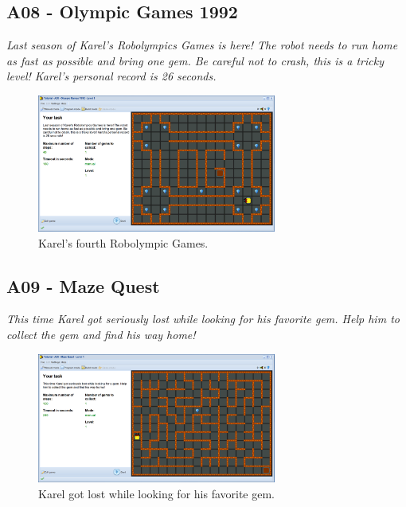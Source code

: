\documentclass[article,A4,12pt]{llncs}
\begin{document}
\subsection{A08 - Olympic Games 1992}

{\em Last season of Karel's Robolympics Games is here! The 
robot needs to run home as fast as possible and bring one gem. 
Be careful not to crash, this is a tricky level! Karel's personal record is 26 seconds.}\\[-7mm]

\begin{figure}[!ht]
\begin{center}
\includegraphics[width=0.7\textwidth]{img/a08.png}
\end{center}
\vspace{-4mm}
\caption{Karel's fourth Robolympic Games.}
\label{fig:a08}
\vspace{-4mm}
\end{figure}
\noindent


\subsection{A09 - Maze Quest}

{\em This time Karel got seriously lost while looking for his favorite gem. 
Help him to collect the gem and find his way home!}\\[-7mm]

\begin{figure}[!ht]
\begin{center}
\includegraphics[width=0.7\textwidth]{img/a09.png}
\end{center}
\vspace{-4mm}
\caption{Karel got lost while looking for his favorite gem.}
\label{fig:a09}
\vspace{-4mm}
\end{figure}
\noindent
\newpage
\end{document}
